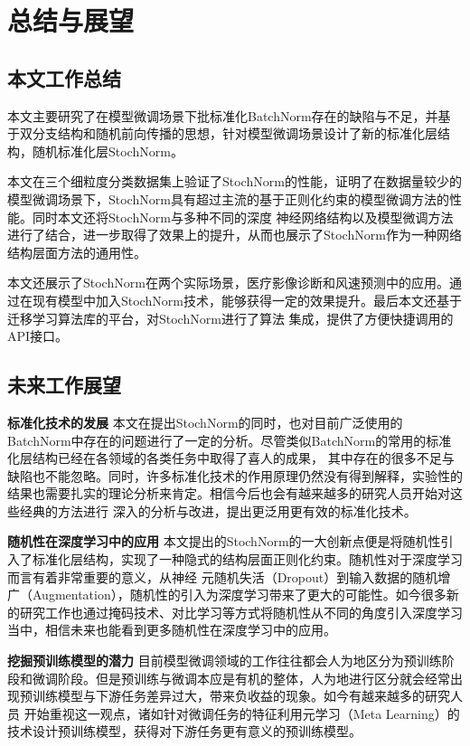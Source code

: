 
\chapter{总结与展望}

\section{本文工作总结}

本文主要研究了在模型微调场景下批标准化BatchNorm存在的缺陷与不足，并基于双分支结构和随机前向传播的思想，针对模型微调场景设计了新的标准化层结构，随机标准化层StochNorm。

本文在三个细粒度分类数据集上验证了StochNorm的性能，证明了在数据量较少的模型微调场景下，StochNorm具有超过主流的基于正则化约束的模型微调方法的性能。同时本文还将StochNorm与多种不同的深度
神经网络结构以及模型微调方法进行了结合，进一步取得了效果上的提升，从而也展示了StochNorm作为一种网络结构层面方法的通用性。

本文还展示了StochNorm在两个实际场景，医疗影像诊断和风速预测中的应用。通过在现有模型中加入StochNorm技术，能够获得一定的效果提升。最后本文还基于迁移学习算法库的平台，对StochNorm进行了算法
集成，提供了方便快捷调用的API接口。

\section{未来工作展望}

\textbf{标准化技术的发展 } 本文在提出StochNorm的同时，也对目前广泛使用的BatchNorm中存在的问题进行了一定的分析。尽管类似BatchNorm的常用的标准化层结构已经在各领域的各类任务中取得了喜人的成果，
其中存在的很多不足与缺陷也不能忽略。同时，许多标准化技术的作用原理仍然没有得到解释，实验性的结果也需要扎实的理论分析来肯定。相信今后也会有越来越多的研究人员开始对这些经典的方法进行
深入的分析与改进，提出更泛用更有效的标准化技术。

\textbf{随机性在深度学习中的应用 } 本文提出的StochNorm的一大创新点便是将随机性引入了标准化层结构，实现了一种隐式的结构层面正则化约束。随机性对于深度学习而言有着非常重要的意义，从神经
元随机失活（Dropout）到输入数据的随机增广（Augmentation），随机性的引入为深度学习带来了更大的可能性。如今很多新的研究工作也通过掩码技术、对比学习等方式将随机性从不同的角度引入深度学习
当中，相信未来也能看到更多随机性在深度学习中的应用。

\textbf{挖掘预训练模型的潜力 } 
目前模型微调领域的工作往往都会人为地区分为预训练阶段和微调阶段。但是预训练与微调本应是有机的整体，人为地进行区分就会经常出现预训练模型与下游任务差异过大，带来负收益的现象。如今有越来越多的研究人员
开始重视这一观点，诸如针对微调任务的特征利用元学习（Meta Learning）的技术设计预训练模型，获得对下游任务更有意义的预训练模型。

